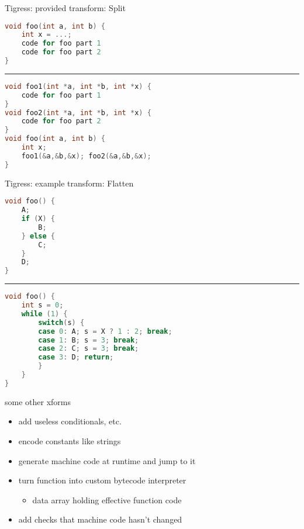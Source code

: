 \begin{frame}[fragile,label=TigressSplit]{Tigress: provided transform: Split}
\begin{lstlisting}[language=C++,style=smaller]
void foo(int a, int b) {
    int x = ...;
    code for foo part 1
    code for foo part 2
}
\end{lstlisting}
\hrule
\begin{lstlisting}[language=C++,style=smaller]
void foo1(int *a, int *b, int *x) {
    code for foo part 1
}
void foo2(int *a, int *b, int *x) {
    code for foo part 2
}
void foo(int a, int b) {
    int x;
    foo1(&a,&b,&x); foo2(&a,&b,&x);
}
\end{lstlisting}
\end{frame}

\begin{frame}[fragile,label=TigressFlatten]{Tigress: example transform: Flatten}
\begin{lstlisting}[language=C++,style=size10]
void foo() {
    A;
    if (X) {
        B;
    } else {
        C;
    }
    D;
}
\end{lstlisting}
\hrule
\begin{lstlisting}[language=C++,style=size10]
void foo() {
    int s = 0;
    while (1) { 
        switch(s) {
        case 0: A; s = X ? 1 : 2; break;
        case 1: B; s = 3; break;
        case 2: C; s = 3; break;
        case 3: D; return;
        }
    }
}
\end{lstlisting}
\end{frame}

\begin{frame}{some other xforms}
    \begin{itemize}
    \item add useless conditionals, etc.
    \item encode constants like strings
    \item generate machine code at runtime and jump to it
    \item turn function into custom bytecode interpreter
        \begin{itemize}
        \item data array holding effective function code
        \end{itemize}
    \item add checks that machine code hasn't changed
    \end{itemize}
\end{frame}

